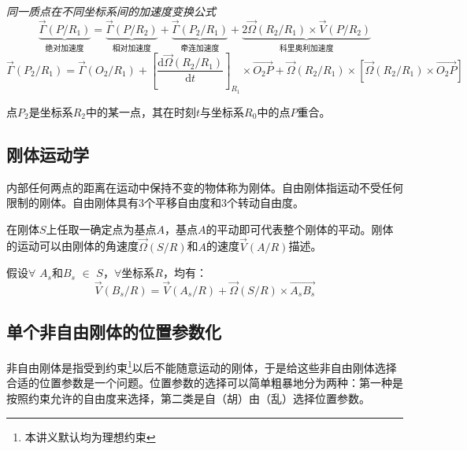 \documentclass[UTF8]{ctexart}%
\begin{document}
\emph{同一质点在不同坐标系间的加速度变换公式}
\begin{equation}
\underbrace{\overrightarrow{\Gamma}\left(P/R_1\right)}_{\text{绝对加速度}}=\underbrace{\overrightarrow{\Gamma}\left(P/R_2\right)}_{\text{相对加速度}}+\underbrace{\overrightarrow{\Gamma}\left(P_2/R_1\right)}_{\text{牵连加速度}}+\underbrace{2\overrightarrow{\Omega}\left(R_2/R_1\right)\times\overrightarrow{V}\left(P/R_2\right)}_{\text{科里奥利加速度}}
\end{equation}
\begin{equation}
\overrightarrow{\Gamma}\left(P_2/R_1\right)=\overrightarrow{\Gamma}\left(O_2/R_1\right)+\left[\frac{\mathrm{d}\overrightarrow{\Omega}\left(R_2/R_1\right)}{\mathrm{d}t} \right]_{R_1}\times\overrightarrow{O_2P}+\overrightarrow{\Omega}\left(R_2/R_1\right)\times\left[\overrightarrow{\Omega}\left(R_2/R_1\right)\times\overrightarrow{O_2P}\right]
\end{equation}

点$P_2$是坐标系$R_2$中的某一点，其在时刻$t$与坐标系$R_0$中的点$P$重合。

\subsection{刚体运动学}
\label{sec:刚体运动学}
内部任何两点的距离在运动中保持不变的物体称为刚体。自由刚体指运动不受任何限制的刚体。自由刚体具有3个平移自由度和3个转动自由度。 

在刚体$S$上任取一确定点为基点$A$，基点$A$的平动即可代表整个刚体的平动。刚体的运动可以由刚体的角速度$\overrightarrow{\Omega}\left(S/R\right)$和$A$的速度$\overrightarrow{V}\left(A/R\right)$描述。

假设$\forall$ $A_s$和$B_s$ $\in$ $S$，$\forall$坐标系$R$，均有：
\begin{equation}
\overrightarrow{V}\left(B_s/R\right)=\overrightarrow{V}\left(A_s/R\right)+\overrightarrow{\Omega}\left(S/R\right)\times \overrightarrow{A_sB_s}
\end{equation}


\subsection{单个非自由刚体的位置参数化}
\label{sec:单个非自由刚体的位置参数化}
非自由刚体是指受到约束\footnote{本讲义默认均为理想约束}以后不能随意运动的刚体，于是给这些非自由刚体选择合适的位置参数是一个问题。位置参数的选择可以简单粗暴地分为两种：第一种是按照约束允许的自由度来选择，第二类是自（胡）由（乱）选择位置参数。
\end{document}
